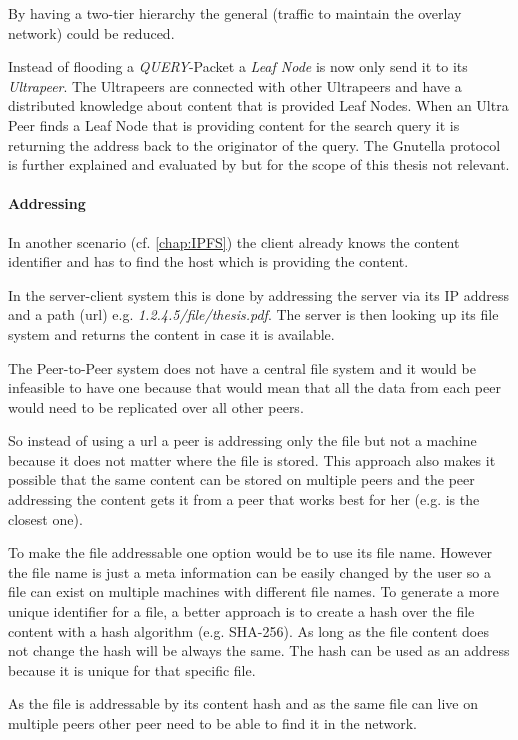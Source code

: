 By having a two-tier hierarchy the general  (traffic to maintain the overlay network) could be reduced.

Instead of flooding a \textit{QUERY}-Packet a \textit{Leaf Node} is now only send it to its \textit{Ultrapeer}. The Ultrapeers are connected with other Ultrapeers and have a distributed knowledge about content that is provided Leaf Nodes. When an Ultra Peer finds a Leaf Node that is providing content for the search query it is returning the address back to the originator of the query. The Gnutella protocol is further explained and evaluated by \citet{gnutellaAnalysis} but for the scope of this thesis not relevant.

\paragraph{Addressing}
In another scenario (cf. \vref{chap:IPFS}) the client already knows the content identifier and has to find the host which is providing the content.

In the server-client system this is done by addressing the server via its IP address and a path (\gls{url}) e.g. \textit{1.2.4.5/file/thesis.pdf}. The server is then looking up its file system and returns the content in case it is available.

The Peer-to-Peer system does not have a central file system and it would be infeasible to have one because that would mean that all the data from each peer would need to be replicated over all other peers.

So instead of using a \gls{url} a peer is addressing only the file but not a machine because it does not matter where the file is stored. This approach also makes it possible that the same content can be stored on multiple peers and the peer addressing the content gets it from a peer that works best for her (e.g. is the closest one).

To make the file addressable one option would be to use its file name. However the file name is just a meta information can be easily changed by the user so a file can exist on multiple machines with different file names. To generate a more unique identifier for a file, a better approach is to create a hash over the file content with a hash algorithm (e.g. SHA-256). As long as the file content does not change the hash will be always the same. The hash can be used as an address because it is unique for that specific file.

As the file is addressable by its content hash and as the same file can live on multiple peers other peer need to be able to find it in the network.

